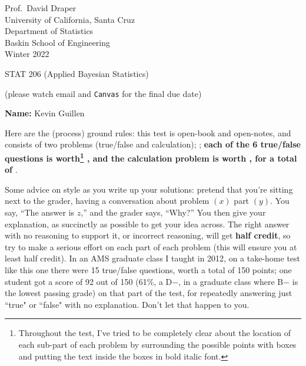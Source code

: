 \documentclass[12pt]{article}
\begin{document}
\begin{flushleft}

Prof.~David Draper \\
University of California, Santa Cruz \\
Department of Statistics \\
Baskin School of Engineering \\
Winter 2022

\end{flushleft}

\Large

\begin{center}

STAT 206 (\textsf{Applied Bayesian Statistics})

\hspace*{-0.1in}

\large

(please watch email and \texttt{Canvas} for the final due date)

\end{center}

\normalsize

\textbf{Name:} Kevin Guillen

Here are the (process) ground rules: this test is open-book and open-notes, and
consists of two problems (true/false and calculation); ; \textbf{each of the 6
true/false questions is worth\footnote{Throughout the test, I've tried to be completely clear about the location of each sub-part of each problem by surrounding the possible points with boxes and putting the text inside the boxes in bold italic font.} , \vspace*{0.025in} and the calculation problem is worth , for a total of }.

Some advice on style as you write up your solutions: pretend that you're sitting next to the grader, having a conversation about problem $( x )$ part $( y )$. You say, ``The answer is $z$,'' and the grader says, ``Why?'' You then give your explanation, as succinctly as possible to get your idea across. The right answer with no reasoning to support it, or incorrect reasoning, will get \textbf{half credit}, so try to make a serious effort on each part of each problem (this will ensure you at least half credit). In an AMS graduate class I taught in 2012, on a take-home test like this one there were 15 true/false questions, worth a total of 150 points; one student got a score of 92 out of 150 (61\%, a D$-$, in a graduate class where B$-$ is the lowest passing grade) on that part of the test, for repeatedly answering just ``true" or ``false" with no explanation. Don't let that happen to you.  
\end{document}
